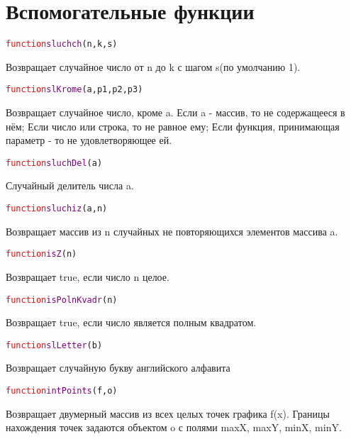 \documentclass[a4paper,12pt]{article}
\begin{document}
	\section{Вспомогательные функции}
	\begin{alltt} 	\textcolor{Red}{function} \textcolor{Purple}{sluchch}(n,k,s)
	\end{alltt}
	Возвращает случайное число от n до k с шагом s(по умолчанию 1).
	\begin{alltt} 	\textcolor{Red}{function} \textcolor{Purple}{slKrome}(a,p1,p2,p3)
	\end{alltt}
	Возвращает случайное число, кроме a. Если a \-- массив, то не содержащееся в нём; Если число или строка, то не равное ему; Если функция, принимающая параметр - то не удовлетворяющее ей.
	\begin{alltt} 	\textcolor{Red}{function} \textcolor{Purple}{sluchDel}(a)
	\end{alltt}
	Случайный делитель числа a.
	\begin{alltt} 	\textcolor{Red}{function} \textcolor{Purple}{sluchiz}(a,n)
	\end{alltt}
	Возвращает массив из n случайных не повторяющихся элементов массива a. 
	\begin{alltt} 	\textcolor{Red}{function} \textcolor{Purple}{isZ}(n)
	\end{alltt}
	Возвращает true, если число n целое.
	\begin{alltt} 	\textcolor{Red}{function} \textcolor{Purple}{isPolnKvadr}(n)
	\end{alltt}
	Возвращает true, если число является полным квадратом.
	\begin{alltt} 	\textcolor{Red}{function} \textcolor{Purple}{slLetter}(b)
	\end{alltt}
	Возвращает случайную букву английского алфавита
	\begin{alltt} 	\textcolor{Red}{function} \textcolor{Purple}{intPoints}(f,o)
	\end{alltt}
  	Возвращает двумерный массив из всех целых точек графика f(x).  Границы нахождения точек задаются объектом o с полями maxX, maxY, minX, minY.
\end{document}
